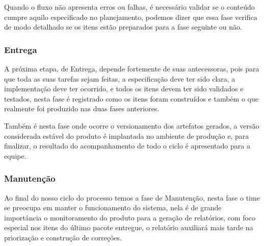 \documentclass[	DIV=calc,%
							paper=a4,%
							fontsize=12pt,%
							onecolumn]{scrartcl}	 					%
\begin{document}
	 Quando o fluxo não apresenta erros ou falhas, é necessário validar se o conteúdo cumpre aquilo especificado no planejamento, podemos dizer que essa fase verifica de modo detalhado se os itens estão preparados para a fase seguinte ou não. 
	
	\subsubsection{Entrega}
	A próxima etapa, de Entrega, depende fortemente de suas antecessoras, pois para que toda as suas tarefas sejam feitas, a especificação deve ter sido clara, a implementação deve ter ocorrido, e todos os itens devem ter sido validados e testados, nesta fase é registrado como os itens foram construídos e também o que realmente foi produzido nas duas fases anteriores. 
	
	Também é nesta fase onde ocorre o versionamento dos artefatos gerados, a versão considerada estável do produto é implantada no ambiente de produção e, para finalizar, o resultado do acompanhamento de todo o ciclo é apresentado para a equipe. 
	
	\subsubsection{Manutenção}
	Ao final do nosso ciclo do processo temos a fase de Manutenção, nesta fase o time se preocupa em manter o funcionamento do sistema, nela é de grande importância o monitoramento do produto para a geração de relatórios, com foco especial nos itens do último pacote entregue, o relatório auxiliará mais tarde na priorização e construção de correções. 
\end{document}
